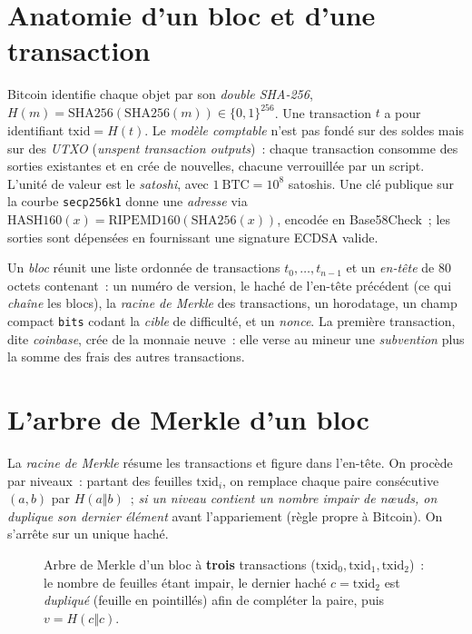 \documentclass[11pt,a4paper]{article}
\theoremstyle{definition}\newtheorem{definition}{Définition}
\theoremstyle{plain}\newtheorem{theoreme}{Théorème}\newtheorem{proposition}{Proposition}
\theoremstyle{remark}\newtheorem{remarque}{Remarque}
\begin{document}
\section{Anatomie d'un bloc et d'une transaction}

Bitcoin identifie chaque objet par son \emph{double SHA-256}, $H(m)=\mathrm{SHA256}(\mathrm{SHA256}(m))
\in\{0,1\}^{256}$. Une transaction $t$ a pour identifiant $\mathrm{txid}=H(t)$. Le \emph{modèle
comptable} n'est pas fondé sur des soldes mais sur des \emph{UTXO} (\emph{unspent transaction
outputs})~: chaque transaction consomme des sorties existantes et en crée de nouvelles, chacune
verrouillée par un script. L'unité de valeur est le \emph{satoshi}, avec $1~\text{BTC}=10^{8}$
satoshis. Une clé publique sur la courbe \texttt{secp256k1} donne une \emph{adresse} via
$\mathrm{HASH160}(x)=\mathrm{RIPEMD160}(\mathrm{SHA256}(x))$, encodée en Base58Check~; les sorties
sont dépensées en fournissant une signature ECDSA valide.

Un \emph{bloc} réunit une liste ordonnée de transactions $t_0,\dots,t_{n-1}$ et un \emph{en-tête}
de $80$ octets contenant~: un numéro de version, le haché de l'en-tête précédent (ce qui
\emph{chaîne} les blocs), la \emph{racine de Merkle} des transactions, un horodatage, un champ
compact \texttt{bits} codant la \emph{cible} de difficulté, et un \emph{nonce}. La première
transaction, dite \emph{coinbase}, crée de la monnaie neuve~: elle verse au mineur une
\emph{subvention} plus la somme des frais des autres transactions.

\section{L'arbre de Merkle d'un bloc}

La \emph{racine de Merkle} résume les transactions et figure dans l'en-tête. On procède par
niveaux~: partant des feuilles $\mathrm{txid}_i$, on remplace chaque paire consécutive $(a,b)$ par
$H(a\Vert b)$~; \emph{si un niveau contient un nombre impair de n\oe uds, on duplique son dernier
élément} avant l'appariement (règle propre à Bitcoin). On s'arrête sur un unique haché.

\begin{figure}[h]\centering
{}
\caption{Arbre de Merkle d'un bloc à \textbf{trois} transactions ($\mathrm{txid}_0,\mathrm{txid}_1,
\mathrm{txid}_2$)~: le nombre de feuilles étant impair, le dernier haché $c=\mathrm{txid}_2$ est
\emph{dupliqué} (feuille en pointillés) afin de compléter la paire, puis $v=H(c\Vert c)$.}
\end{figure}
\end{document}
